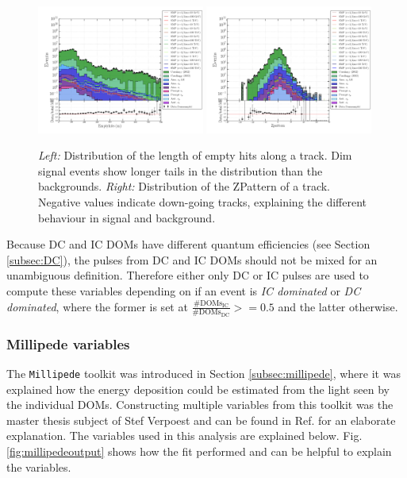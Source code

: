 \begin{figure}
\centering
\includegraphics[width = 0.49\textwidth]{chapter8/img/1D_stack_emptyhits_100.png}
\includegraphics[width = 0.49\textwidth]{chapter8/img/1D_stack_zpattern.png}
\caption{\textit{Left: }Distribution of the length of empty hits along a track. Dim signal events show longer tails in the distribution than the backgrounds. \textit{Right: }Distribution of the ZPattern of a track. Negative values indicate down-going tracks, explaining the different behaviour in signal and background.}
\label{fig:commonvariables4}
\end{figure}

Because DC and IC DOMs have different quantum efficiencies (see Section \ref{subsec:DC}), the pulses from DC and IC DOMs should not be mixed for an unambiguous definition. Therefore either only DC or IC pulses are used to compute these variables depending on if an event is \textit{IC dominated} or \textit{DC dominated}, where the former is set at $\frac{\# \textrm{DOMs}_\textrm{IC}}{\# \textrm{DOMs}_\textrm{DC}} >= 0.5$ and the latter otherwise.

\subsubsection{Millipede variables}
The \texttt{Millipede} toolkit was introduced in Section \ref{subsec:millipede}, where it was explained how the energy deposition could be estimated from the light seen by the individual DOMs. Constructing multiple variables from this toolkit was the master thesis subject of Stef Verpoest and can be found in Ref. \cite{steffthesis} for an elaborate explanation. The variables used in this analysis are explained below. Fig. \ref{fig:millipedeoutput} shows how the fit performed and can be helpful to explain the variables.

